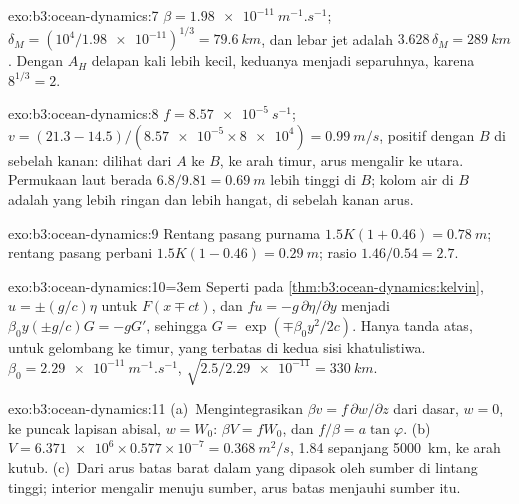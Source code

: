 \begin{solution}{exo:b3:ocean-dynamics:7}
$\beta = \qty{1.98e-11}{m^{-1}.s^{-1}}$; $\delta_M = (10^4/\num{1.98e-11})^{1/3}
= \qty{79.6}{km}$, dan lebar jet adalah $3.628\,\delta_M = \qty{289}{km}$.
Dengan $A_H$ delapan kali lebih kecil, keduanya menjadi separuhnya, karena $8^{1/3} = 2$.
\end{solution}

\begin{solution}{exo:b3:ocean-dynamics:8}
$f = \qty{8.57e-5}{s^{-1}}$; $v = (21.3 - 14.5)/(\num{8.57e-5}\times\num{8e4})
= \qty{0.99}{m/s}$, positif dengan $B$ di sebelah kanan: dilihat dari $A$ ke $B$,
ke arah timur, arus mengalir ke utara. Permukaan laut berada
$6.8/9.81 = \qty{0.69}{m}$ lebih tinggi di $B$; kolom air di $B$ adalah yang
lebih ringan dan lebih hangat, di sebelah kanan arus.
\end{solution}

\begin{solution}{exo:b3:ocean-dynamics:9}
Rentang pasang purnama $1.5K(1 + 0.46) = \qty{0.78}{m}$; rentang pasang perbani $1.5K(1 - 0.46)
= \qty{0.29}{m}$; rasio $1.46/0.54 = 2.7$.
\end{solution}

\begin{solution}{exo:b3:ocean-dynamics:10}\begingroup\emergencystretch=3em\relax 
Seperti pada \cref{thm:b3:ocean-dynamics:kelvin}, $u = \pm(g/c)\eta$ untuk $F(x \mp
ct)$, dan $fu = -g\,\partial\eta/\partial y$ menjadi $\beta_0y(\pm g/c)G =
-gG'$, sehingga $G = \exp(\mp\beta_0y^2/2c)$. Hanya tanda atas, untuk gelombang
ke timur, yang terbatas di kedua sisi khatulistiwa. $\beta_0 =
\qty{2.29e-11}{m^{-1}.s^{-1}}$, $\sqrt{2.5/\num{2.29e-11}} = \qty{330}{km}$.
\par\endgroup\end{solution}

\begin{solution}{exo:b3:ocean-dynamics:11}
(a)~Mengintegrasikan $\beta v = f\,\partial w/\partial z$ dari dasar, $w = 0$,
ke puncak lapisan abisal, $w = W_0$: $\beta V = fW_0$, dan $f/\beta =
a\tan\varphi$. (b)~$V = \num{6.371e6}\times0.577\times10^{-7} =
\qty{0.368}{m^2/s}$, \qty{1.84}{\sverdrup} sepanjang \qty{5000}{km}, ke arah kutub.
(c)~Dari arus batas barat dalam yang dipasok oleh sumber di lintang tinggi;
interior mengalir menuju sumber, arus batas menjauhi
sumber itu.
\end{solution}

